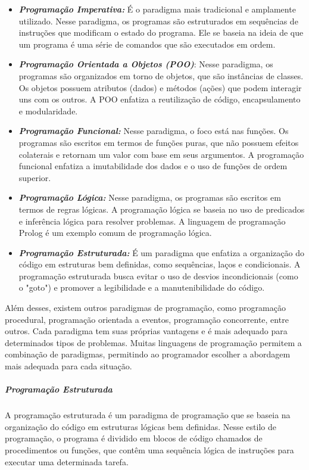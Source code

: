 \documentclass[a4paper, 12pt, onecolumn,singlespacing]{article}
\begin{document}
	\begin{itemize}
		\item \textbf{\textit{Programação Imperativa: }}É o paradigma mais tradicional e amplamente utilizado. Nesse paradigma, os programas são estruturados em sequências de instruções que modificam o estado do programa. Ele se baseia na ideia de que um programa é uma série de comandos que são executados em ordem.
		
		\item \textbf{\textit{Programação Orientada a Objetos (POO)}}: Nesse paradigma, os programas são organizados em torno de objetos, que são instâncias de classes. Os objetos possuem atributos (dados) e métodos (ações) que podem interagir uns com os outros. A POO enfatiza a reutilização de código, encapsulamento e modularidade.
		
		\item \textbf{\textit{Programação Funcional:}} Nesse paradigma, o foco está nas funções. Os programas são escritos em termos de funções puras, que não possuem efeitos colaterais e retornam um valor com base em seus argumentos. A programação funcional enfatiza a imutabilidade dos dados e o uso de funções de ordem superior.
		
		\item \textbf{\textit{Programação Lógica:}} Nesse paradigma, os programas são escritos em termos de regras lógicas. A programação lógica se baseia no uso de predicados e inferência lógica para resolver problemas. A linguagem de programação Prolog é um exemplo comum de programação lógica.
		
		\item \textbf{\textit{Programação Estruturada:}} É um paradigma que enfatiza a organização do código em estruturas bem definidas, como sequências, laços e condicionais. A programação estruturada busca evitar o uso de desvios incondicionais (como o "goto") e promover a legibilidade e a manutenibilidade do código.
		
	\end{itemize}
	
	Além desses, existem outros paradigmas de programação, como programação procedural, programação orientada a eventos, programação concorrente, entre outros. Cada paradigma tem suas próprias vantagens e é mais adequado para determinados tipos de problemas. Muitas linguagens de programação permitem a combinação de paradigmas, permitindo ao programador escolher a abordagem mais adequada para cada situação.
	
	\subparagraph{Programação Estruturada}
	\label{programacao_estruturada} A programação estruturada é um paradigma de programação que se baseia na organização do código em estruturas lógicas bem definidas. Nesse estilo de programação, o programa é dividido em blocos de código chamados de procedimentos ou funções, que contêm uma sequência lógica de instruções para executar uma determinada tarefa.
	
\end{document}
